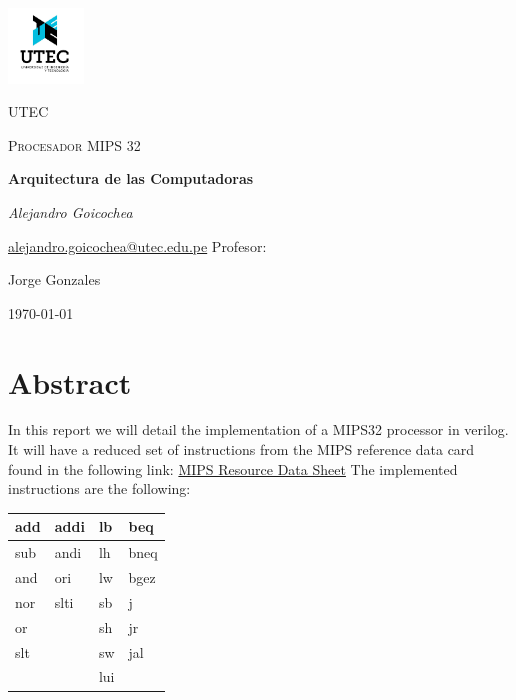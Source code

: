 \documentclass[12pt,a4paper]{article}
\begin{document}
\begin{titlepage}
	\centering
	\includegraphics[width=0.15\textwidth]{utec.png}\par\vspace{1cm}
	{\scshape\LARGE UTEC \par}
	\vspace{1cm}
	{\scshape\Large Procesador MIPS 32\par}
	\vspace{1.5cm}
	{\huge\bfseries Arquitectura de las Computadoras\par}
	\vspace{2cm}
	{\Large\itshape Alejandro Goicochea\par}
	\href{mailto:alejandro.goicochea@utec.edu.pe}{alejandro.goicochea@utec.edu.pe}
	\vfill
	Profesor:\par
	Jorge Gonzales

	\vfill
	{\large \today\par}
\end{titlepage}

\section{Abstract}
In this report we will detail the implementation of a MIPS32 processor in verilog. It will have a reduced set of instructions from the MIPS reference data card found in the following link: \href{https://inst.eecs.berkeley.edu/~cs61c/resources/MIPS_Green_Sheet.pdf}{MIPS Resource Data Sheet} The implemented instructions are the following:\\


\begin{table}[htb]
\begin{center}
\begin{tabular}{|l|l|l|l|}
\hline
add & addi & lb  & beq  \\ \hline
sub & andi & lh  & bneq \\ \hline
and & ori  & lw  & bgez \\ \hline
nor & slti & sb  & j    \\ \hline
or  &      & sh  & jr   \\ \hline
slt &      & sw  & jal  \\ \hline
    &      & lui &      \\ \hline
\end{tabular}
\end{center}
\end{table}
\end{document}
